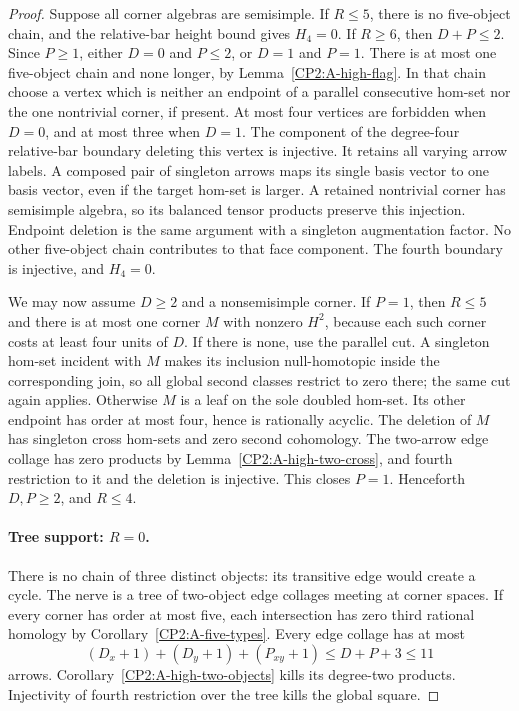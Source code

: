 \begin{proof}
Suppose all corner algebras are semisimple.  If $R\leq5$,
there is no five-object chain, and the relative-bar height
bound gives $H_4=0$.  If $R\geq6$, then $D+P\leq2$.
Since $P\geq1$, either $D=0$ and $P\leq2$, or $D=1$
and $P=1$.  There is at most one five-object chain and
none longer, by Lemma~\ref{CP2:A-high-flag}.  In that
chain choose a vertex which is neither an endpoint of
a parallel consecutive hom-set nor the one nontrivial
corner, if present.  At most four vertices are forbidden
when $D=0$, and at most three when $D=1$.
The component of the degree-four relative-bar boundary
deleting this vertex is injective.  It retains all varying
arrow labels.  A composed pair of singleton arrows maps
its single basis vector to one basis vector, even if the
target hom-set is larger.  A retained nontrivial corner
has semisimple algebra, so its balanced tensor products
preserve this injection.  Endpoint deletion is the same
argument with a singleton augmentation factor.  No other
five-object chain contributes to that face component.
The fourth boundary is injective, and $H_4=0$.

We may now assume $D\geq2$ and a nonsemisimple corner.
If $P=1$, then $R\leq5$ and there is at most one corner
$M$ with nonzero $H^2$, because each such corner costs
at least four units of $D$.  If there is none, use the
parallel cut.  A singleton hom-set incident with $M$
makes its inclusion null-homotopic inside the corresponding
join, so all global second classes restrict to zero there;
the same cut again applies.  Otherwise $M$ is a leaf on
the sole doubled hom-set.  Its other endpoint has order
at most four, hence is rationally acyclic.  The deletion
of $M$ has singleton cross hom-sets and zero second
cohomology.  The two-arrow edge collage has zero products
by Lemma~\ref{CP2:A-high-two-cross}, and fourth restriction
to it and the deletion is injective.  This closes $P=1$.
Henceforth $D,P\geq2$, and $R\leq4$.

\paragraph{Tree support: $R=0$.}
There is no chain of three distinct objects: its transitive
edge would create a cycle.  The nerve is a tree of
two-object edge collages meeting at corner spaces.
If every corner has order at most five, each intersection
has zero third rational homology by
Corollary~\ref{CP2:A-five-types}.  Every edge collage has
at most
\[
 (D_x+1)+(D_y+1)+(P_{xy}+1)\leq D+P+3\leq11
\]
arrows.  Corollary~\ref{CP2:A-high-two-objects} kills its
degree-two products.  Injectivity of fourth restriction
over the tree kills the global square.


\end{proof}
